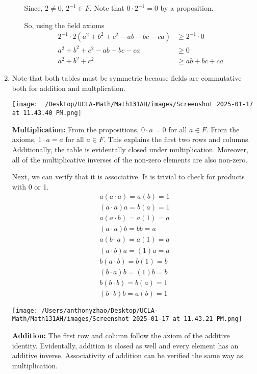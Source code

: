 \documentclass[12pt]{article}
\begin{document}
\begin{enumerate}[start=1,label={\bfseries Problem \arabic*:},leftmargin=1in]
\begin{enumerate}
        Since, $2 \neq 0$, $2^{-1} \in F$. Note that $0 \cdot 2^{-1} = 0$ by a proposition. 

        So, using the field axioms 
        \begin{align*}
            2^{-1} \cdot 2(a^{2}+b^{2}+c^{2} - ab - bc - ca) &\geq 2^{-1} \cdot 0\\ 
            a^{2} + b^{2} + c^{2} - ab - bc - ca &\geq  0\\ 
            a^{2} + b^{2} + c^{2} &\geq ab + bc + ca
        \end{align*}
    \end{enumerate}

    \item Note that both tables must be symmetric because fields are commutative 
    both for addition and multplication. 

    \texttt{[image: ~/Desktop/UCLA-Math/Math131AH/images/Screenshot 2025-01-17 at 11.43.40 PM.png]}
    
    \textbf{Multiplication:} From the propositions, $0 \cdot a = 0$ for all $a \in F$. 
    From the axioms, $1 \cdot a = a$ for all $a \in F$. This explains the first two rows and columns. 
    Additionally, the table is evidentally closed under multiplication. Moreover, all of the multiplicative inverses of the non-zero elements 
    are also non-zero. 

    Next, we can verify that it is associative. It is trivial to check for products with 0 or 1. 
    \begin{align*}
        a(a \cdot a) = a(b) = 1 \\ 
        (a \cdot a)a = b(a) = 1 \\ 
        a(a \cdot b) = a(1) = a \\ 
        (a \cdot a)b = bb = a \\ 
        a(b \cdot a) = a(1) = a \\ 
        (a \cdot b)a = (1)a = a \\ 
        b(a \cdot b) = b(1) = b \\ 
        (b \cdot a)b = (1)b = b \\ 
        b(b \cdot b) = b(a) = 1 \\ 
        (b \cdot b)b = a(b) = 1
    \end{align*}
    
    \texttt{[image: /Users/anthonyzhao/Desktop/UCLA-Math/Math131AH/images/Screenshot 2025-01-17 at 11.43.21 PM.png]}
    
    \textbf{Addition:} The first row and column follow the axiom of the additive identity. Evidentally, addition is closed as well 
    and every element has an additive inverse. Associativity of addition can be verified the same way as multiplication. 


\end{enumerate}
\end{document}
